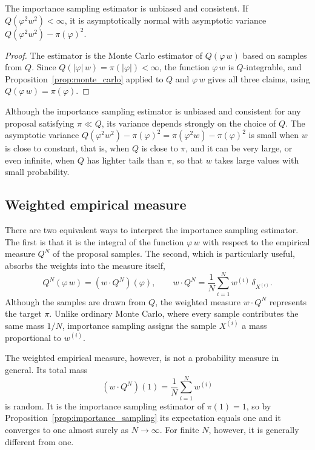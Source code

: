 \begin{proposition}
    \label{prop:importance_sampling}
    The importance sampling estimator is unbiased and consistent. If $Q(\varphi^2w^2)<\infty$, it is asymptotically normal with asymptotic variance $Q(\varphi^2w^2)-\pi(\varphi)^2$.
\end{proposition}
\begin{proof}
    The estimator is the Monte Carlo estimator of $Q(\varphi\,w)$ based on samples from $Q$. Since $Q(|\varphi|\,w) = \pi(|\varphi|)<\infty$, the function $\varphi\,w$ is $Q$-integrable, and Proposition~\ref{prop:monte_carlo} applied to $Q$ and $\varphi\,w$ gives all three claims, using $Q(\varphi\,w) = \pi(\varphi)$.
\end{proof}

Although the importance sampling estimator is unbiased and consistent for any proposal satisfying $\pi\ll Q$, its variance depends strongly on the choice of $Q$. The asymptotic variance $Q(\varphi^2w^2)-\pi(\varphi)^2 = \pi(\varphi^2w)-\pi(\varphi)^2$ is small when $w$ is close to constant, that is, when $Q$ is close to $\pi$, and it can be very large, or even infinite, when $Q$ has lighter tails than $\pi$, so that $w$ takes large values with small probability.

\subsection{Weighted empirical measure}
\label{sec:weighted_empirical_measure}
There are two equivalent ways to interpret the importance sampling estimator. The first is that it is the integral of the function $\varphi\,w$ with respect to the empirical measure $Q^N$ of the proposal samples. The second, which is particularly useful, absorbs the weights into the measure itself,
\begin{equation}
    Q^N(\varphi\,w) = (w\cdot Q^N)(\varphi), \qquad w\cdot Q^N = \frac{1}{N}\sum_{i=1}^{N}w^{(i)}\,\delta_{X^{(i)}}.
\end{equation}
Although the samples are drawn from $Q$, the weighted measure $w\cdot Q^N$ represents the target $\pi$. Unlike ordinary Monte Carlo, where every sample contributes the same mass $1/N$, importance sampling assigns the sample $X^{(i)}$ a mass proportional to $w^{(i)}$.

The weighted empirical measure, however, is not a probability measure in general. Its total mass
\begin{equation}
    (w\cdot Q^N)(1) = \frac{1}{N}\sum_{i=1}^{N}w^{(i)}
\end{equation}
is random. It is the importance sampling estimator of $\pi(1) = 1$, so by Proposition~\ref{prop:importance_sampling} its expectation equals one and it converges to one almost surely as $N\to\infty$. For finite $N$, however, it is generally different from one.

